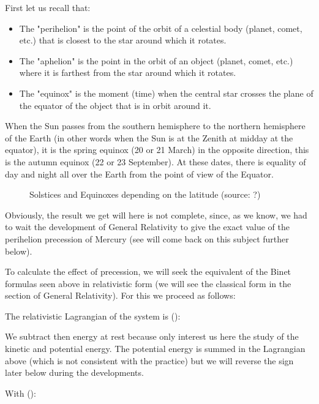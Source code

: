 	First let us recall that:
	\begin{itemize}
		\item The "perihelion" is the point of the orbit of a celestial body (planet, comet, etc.) that is closest to the star around which it rotates.

		\item The "aphelion" is the point in the orbit of an object (planet, comet, etc.) where it is farthest from the star around which it rotates.

		\item The "equinox" is the moment (time) when the central star crosses the plane of the equator of the object that is in orbit around it.
	\end{itemize}
	\begin{tcolorbox}[title=Remark,colframe=black,arc=10pt]
	When the Sun passes from the southern hemisphere to the northern hemisphere of the Earth (in other words when the Sun is at the Zenith at midday at the equator), it is the spring equinox (20 or 21 March) in the opposite direction, this is the autumn equinox (22 or 23 September). At these dates, there is equality of day and night all over the Earth from the point of view of the Equator.
	\begin{figure}[H]
		\centering
		\caption[Solstices and Equinoxes depending on the latitude]{Solstices and Equinoxes depending on the latitude (source: ?)}
	\end{figure}
	\end{tcolorbox}
	Obviously, the result we get will here is not complete, since, as we know, we had to wait the development of General Relativity to give the exact value of the perihelion  precession of Mercury (see will come back on this subject further below).

	To calculate the effect of precession, we will seek the equivalent of the Binet formulas seen above in relativistic form (we will see the classical form in the section of General Relativity). For this we proceed as follows:

	The relativistic Lagrangian of the system is ():
	
	\begin{tcolorbox}[title=Remark,colframe=black,arc=10pt]
	We subtract then energy at rest because only interest us here the study of the kinetic and potential energy. The potential energy is summed in the Lagrangian above (which is not consistent with the practice) but we will reverse the sign later below during the developments.
	\end{tcolorbox}
	With ():
	
